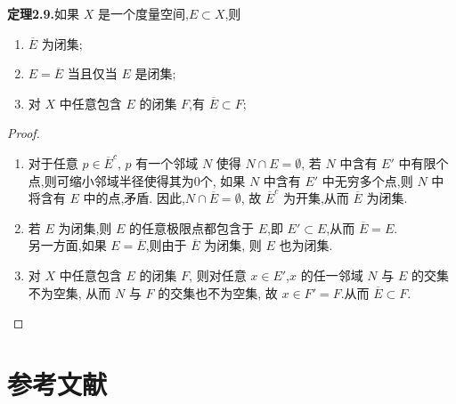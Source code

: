\documentclass[12pt]{article}
\begin{document}
\textbf{定理2.9.}如果 $X$ 是一个度量空间,$E\subset X$,则
\begin{enumerate}[label={\textbullet}]
    \item $\overline{E}$ 为闭集;
    \item $E = \overline{E}$ 当且仅当 $E$ 是闭集;
    \item 对 $X$ 中任意包含 $E$ 的闭集 $F$,有 $\overline{E} \subset F$;
\end{enumerate}
\begin{proof}
    $ $
    \begin{enumerate}[label={\textbullet}]
        \item 对于任意 $p\in \overline{E}^c$,
        $p$ 有一个邻域 $N$ 使得 $N\cap E = \emptyset$,
        若 $N$ 中含有 $E'$ 中有限个点,则可缩小邻域半径使得其为0个,
        如果 $N$ 中含有 $E'$ 中无穷多个点,则 $N$ 中将含有 $E$ 中的点,矛盾.
        因此,$N\cap \overline{E} = \emptyset$,
        故 $\overline{E}^c$ 为开集,从而 $\overline{E}$ 为闭集.
        \item 若 $E$ 为闭集,则 $E$ 的任意极限点都包含于 $E$,即
        $E'\subset E$,从而 $\overline{E} = E$.\\
        另一方面,如果 $E = \overline{E}$,则由于 $\overline{E}$ 为闭集,
        则 $E$ 也为闭集.
        \item 对 $X$ 中任意包含 $E$ 的闭集 $F$,
        则对任意 $x\in E'$,$x$ 的任一邻域 $N$ 与 $E$ 的交集不为空集,
        从而 $N$ 与 $F$ 的交集也不为空集,
        故 $x\in F'=F$.从而 $\overline{E} \subset F$.
    \end{enumerate}
\end{proof}

\renewcommand{\refname}{} %
\section*{参考文献} %

\vspace{-2em} %

\nocite{*} %

\end{document}

